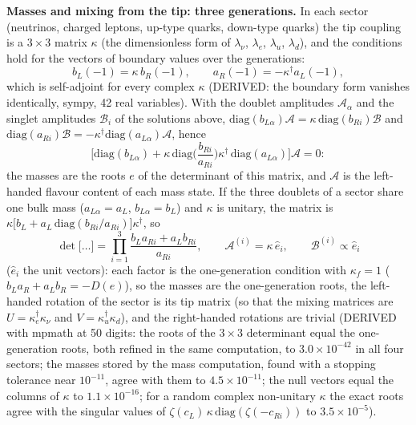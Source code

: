 \documentclass[
  10pt,
]{article}
\begin{document}
\textbf{Masses and mixing from the tip: three generations.} In each
sector (neutrinos, charged leptons, up-type quarks, down-type quarks)
the tip coupling is a \(3\times3\) matrix \(\kappa\) (the dimensionless
form of \(\lambda_\nu\), \(\lambda_e\), \(\lambda_u\), \(\lambda_d\)),
and the conditions hold for the vectors of boundary values over the
generations:
\[ b_L(-1) = \kappa\, b_R(-1),\qquad a_R(-1) = -\kappa^\dagger a_L(-1), \]
which is self-adjoint for every complex \(\kappa\) (DERIVED: the
boundary form vanishes identically, sympy, 42 real variables). With the
doublet amplitudes \(\mathcal A_\alpha\) and the singlet amplitudes
\(\mathcal B_i\) of the solutions above,
\(\mathrm{diag}(b_{L\alpha})\mathcal A = \kappa\,\mathrm{diag}(b_{Ri})\mathcal B\)
and
\(\mathrm{diag}(a_{Ri})\mathcal B = -\kappa^\dagger\mathrm{diag}(a_{L\alpha})\mathcal A\),
hence
\[ \Big[\mathrm{diag}(b_{L\alpha}) + \kappa\,\mathrm{diag}\Big(\frac{b_{Ri}}{a_{Ri}}\Big)\kappa^\dagger\,\mathrm{diag}(a_{L\alpha})\Big]\mathcal A = 0 : \]
the masses are the roots \(e\) of the determinant of this matrix, and
\(\mathcal A\) is the left-handed flavour content of each mass state. If
the three doublets of a sector share one bulk mass
(\(a_{L\alpha} = a_L\), \(b_{L\alpha} = b_L\)) and \(\kappa\) is
unitary, the matrix is
\(\kappa\big[b_L + a_L\,\mathrm{diag}(b_{Ri}/a_{Ri})\big]\kappa^\dagger\),
so
\[ \det\big[\dots\big] = \prod_{i=1}^{3}\frac{b_La_{Ri} + a_Lb_{Ri}}{a_{Ri}},\qquad \mathcal A^{(i)} = \kappa\,\hat e_i,\qquad \mathcal B^{(i)} \propto \hat e_i \]
(\(\hat e_i\) the unit vectors): each factor is the one-generation
condition with \(\kappa_f = 1\) (\(b_La_R + a_Lb_R = -D(e)\)), so the
masses are the one-generation roots, the left-handed rotation of the
sector is its tip matrix (so that the mixing matrices are
\(U = \kappa_e^\dagger\kappa_\nu\) and
\(V = \kappa_u^\dagger\kappa_d\)), and the right-handed rotations are
trivial (DERIVED with mpmath at 50 digits: the roots of the \(3\times3\)
determinant equal the one-generation roots, both refined in the same
computation, to \(3.0\times10^{-42}\) in all four sectors; the masses
stored by the mass computation, found with a stopping tolerance near
\(10^{-11}\), agree with them to \(4.5\times10^{-11}\); the null vectors
equal the columns of \(\kappa\) to \(1.1\times10^{-16}\); for a random
complex non-unitary \(\kappa\) the exact roots agree with the singular
values of \(\zeta(c_L)\,\kappa\,\mathrm{diag}(\zeta(-c_{Ri}))\) to
\(3.5\times10^{-5}\)).
\end{document}
